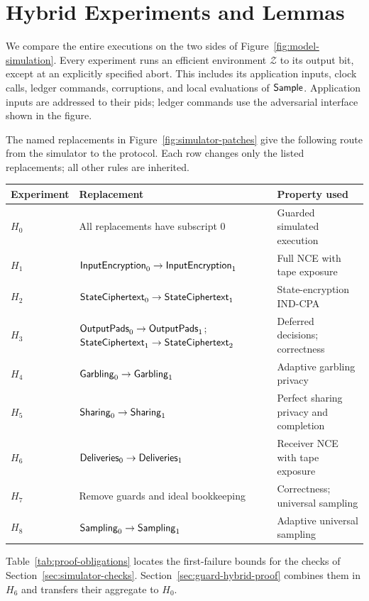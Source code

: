 \section{Hybrid Experiments and Lemmas}
\label{sec:hybrids-details}

We compare the entire executions on the two sides of
Figure~\ref{fig:model-simulation}.  Every experiment runs an efficient
environment $\mathcal Z$ to its output bit, except at an explicitly
specified abort.  This includes its application
inputs, clock calls, ledger commands, corruptions, and local evaluations
of $\mathsf{Sample}$.  Application inputs are addressed to their pids; ledger
commands use the adversarial interface shown in the figure.

The named replacements in Figure~\ref{fig:simulator-patches} give the
following route from the simulator to the protocol.  Each row changes
only the listed replacements; all other rules are inherited.
\begin{center}
\small
\renewcommand{\arraystretch}{1.15}
\begin{tabular}{@{}l>{\raggedright\arraybackslash}p{.47\linewidth}>{\raggedright\arraybackslash}p{.34\linewidth}@{}}
Experiment & Replacement & Property used \\\hline
$H_0$ & All replacements have subscript $0$ & Guarded simulated execution \\
$H_1$ & $\mathsf{InputEncryption}_0\to\mathsf{InputEncryption}_1$ & Full NCE with tape exposure \\
$H_2$ & $\mathsf{StateCiphertext}_0\to\mathsf{StateCiphertext}_1$ & State-encryption IND-CPA \\
$H_3$ & $\mathsf{OutputPads}_0\to\mathsf{OutputPads}_1$;\newline $\mathsf{StateCiphertext}_1\to\mathsf{StateCiphertext}_2$ & Deferred decisions; correctness \\
$H_4$ & $\mathsf{Garbling}_0\to\mathsf{Garbling}_1$ & Adaptive garbling privacy \\
$H_5$ & $\mathsf{Sharing}_0\to\mathsf{Sharing}_1$ & Perfect sharing privacy and completion \\
$H_6$ & $\mathsf{Deliveries}_0\to\mathsf{Deliveries}_1$ & Receiver NCE with tape exposure \\
$H_7$ & Remove guards and ideal bookkeeping & Correctness; universal sampling \\
$H_8$ & $\mathsf{Sampling}_0\to\mathsf{Sampling}_1$ & Adaptive universal sampling
\end{tabular}
\end{center}

Table~\ref{tab:proof-obligations} locates the first-failure bounds for the
checks of Section~\ref{sec:simulator-checks}.  Section~\ref{sec:guard-hybrid-proof}
combines them in $H_6$ and transfers their aggregate to $H_0$.

